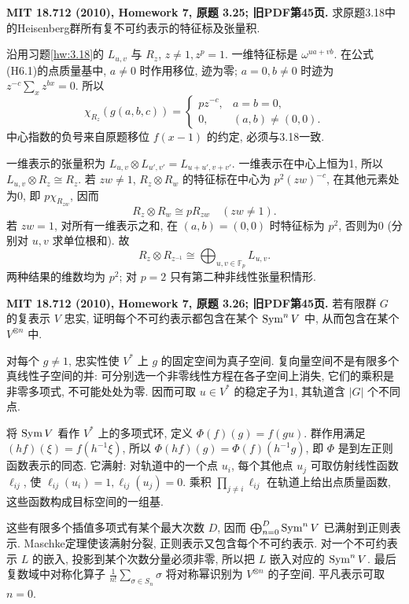 \begin{exercise}\label{hw:3.25}
\textbf{MIT 18.712 (2010), Homework 7, 原题 3.25; 旧PDF第45页.}
求原题3.18中的Heisenberg群所有复不可约表示的特征标及张量积.
\end{exercise}
\begin{solution}
沿用习题\ref{hw:3.18}的 $L_{u,v}$ 与 $R_z$, $z\ne1,z^p=1$. 一维特征标是 $\omega^{ua+vb}$. 在公式(H6.1)的点质量基中, $a\ne0$ 时作用移位, 迹为零; $a=0,b\ne0$ 时迹为 $z^{-c}\sum_xz^{bx}=0$. 所以
\[
 \chi_{R_z}(g(a,b,c))=
 \begin{cases}p z^{-c},&a=b=0,\\0,&(a,b)\ne(0,0).\end{cases}
\]
中心指数的负号来自原题移位 $f(x-1)$ 的约定, 必须与3.18一致.

一维表示的张量积为 $L_{u,v}\otimes L_{u',v'}=L_{u+u',v+v'}$. 一维表示在中心上恒为1, 所以 $L_{u,v}\otimes R_z\cong R_z$. 若 $zw\ne1$, $R_z\otimes R_w$ 的特征标在中心为 $p^2(zw)^{-c}$, 在其他元素处为0, 即 $p\chi_{R_{zw}}$, 因而
\[
 R_z\otimes R_w\cong pR_{zw}\quad(zw\ne1).
\]
若 $zw=1$, 对所有一维表示之和, 在 $(a,b)=(0,0)$ 时特征标为 $p^2$, 否则为0 (分别对 $u,v$ 求单位根和). 故
\[
 R_z\otimes R_{z^{-1}}\cong
 \bigoplus_{u,v\in\mathbb F_p}L_{u,v}.
\]
两种结果的维数均为 $p^2$; 对 $p=2$ 只有第二种非线性张量积情形.
\end{solution}

\begin{exercise}\label{hw:3.26}
\textbf{MIT 18.712 (2010), Homework 7, 原题 3.26; 旧PDF第45页.}
若有限群 $G$ 的复表示 $V$ 忠实, 证明每个不可约表示都包含在某个 $\operatorname{Sym}^nV$ 中, 从而包含在某个 $V^{\otimes n}$ 中.
\end{exercise}
\begin{solution}
对每个 $g\ne1$, 忠实性使 $V^*$ 上 $g$ 的固定空间为真子空间. 复向量空间不是有限多个真线性子空间的并: 可分别选一个非零线性方程在各子空间上消失, 它们的乘积是非零多项式, 不可能处处为零. 因而可取 $u\in V^*$ 的稳定子为1, 其轨道含 $|G|$ 个不同点.

将 $\operatorname{Sym} V$ 看作 $V^*$ 上的多项式环, 定义 $\Phi(f)(g)=f(gu)$. 群作用满足 $(hf)(\xi)=f(h^{-1}\xi)$, 所以 $\Phi(hf)(g)=\Phi(f)(h^{-1}g)$, 即 $\Phi$ 是到左正则函数表示的同态. 它满射: 对轨道中的一个点 $u_i$, 每个其他点 $u_j$ 可取仿射线性函数 $\ell_{ij}$, 使 $\ell_{ij}(u_i)=1,\ell_{ij}(u_j)=0$. 乘积 $\prod_{j\ne i}\ell_{ij}$ 在轨道上给出点质量函数, 这些函数构成目标空间的一组基.

这些有限多个插值多项式有某个最大次数 $D$, 因而 $\bigoplus_{n=0}^D\operatorname{Sym}^nV$ 已满射到正则表示. Maschke定理使该满射分裂, 正则表示又包含每个不可约表示. 对一个不可约表示 $L$ 的嵌入, 投影到某个次数分量必须非零, 所以把 $L$ 嵌入对应的 $\operatorname{Sym}^nV$. 最后复数域中对称化算子 $\frac1{n!}\sum_{\sigma\in S_n}\sigma$ 将对称幂识别为 $V^{\otimes n}$ 的子空间. 平凡表示可取 $n=0$.
\end{solution}


